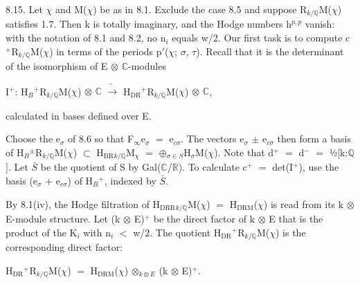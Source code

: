 \documentclass[10pt,twoside]{article}
\begin{document}
8.15. Let \ensuremath{χ} and M(\ensuremath{χ}) be as in 8.1. Exclude the case 8.5 and suppose R\ensuremath{_{k/ℚ}}M(\ensuremath{χ}) satisfies 1.7. Then k is totally imaginary, and the Hodge numbers h\ensuremath{^{p,p}} vanish: with the notation of 8.1 and 8.2, no n\ensuremath{_{i}} equals w/2. Our first task is to compute c\ensuremath{^{+}}R\ensuremath{_{k/ℚ}}M(\ensuremath{χ}) in terms of the periods p\ensuremath{′}(\ensuremath{χ}; \ensuremath{σ}, \ensuremath{τ}). Recall that it is the determinant of the isomorphism of E \ensuremath{⊗} \ensuremath{ℂ}-modules\par
I\ensuremath{^{+}}: H\ensuremath{_{B}}\ensuremath{^{+}}R\ensuremath{_{k/ℚ}}M(\ensuremath{χ}) \ensuremath{⊗} \ensuremath{ℂ}  \ensuremath{\widetilde{→}}  H\ensuremath{_{\mathrm{DR}}}\ensuremath{^{+}}R\ensuremath{_{k/ℚ}}M(\ensuremath{χ}) \ensuremath{⊗} \ensuremath{ℂ},\par
calculated in bases defined over E.\par
Choose the e\ensuremath{_{σ}} of 8.6 so that F\ensuremath{_{∞}}e\ensuremath{_{σ}} \ensuremath{=} e\ensuremath{_{cσ}}. The vectors e\ensuremath{_{σ}} \ensuremath{±} e\ensuremath{_{cσ}} then form a basis of H\ensuremath{_{B}}\ensuremath{^{±}}R\ensuremath{_{k/ℚ}}M(\ensuremath{χ}) \ensuremath{⊂} H\ensuremath{_{\mathrm{BR}}}\ensuremath{_{k/ℚ}}M\ensuremath{_{χ}} \ensuremath{=} \ensuremath{⊕}\ensuremath{_{σ∈S}}H\ensuremath{_{σ}}M(\ensuremath{χ}). Note that d\ensuremath{^{+}} \ensuremath{=} d\ensuremath{^{-}} \ensuremath{=} ½[k:\ensuremath{ℚ}]. Let \ensuremath{\bar{S}} be the quotient of S by Gal(\ensuremath{ℂ}/\ensuremath{ℝ}). To calculate c\ensuremath{^{+}} \ensuremath{=} det(I\ensuremath{^{+}}), use the basis (e\ensuremath{_{σ}} \ensuremath{+} e\ensuremath{_{cσ}}) of H\ensuremath{_{B}}\ensuremath{^{+}}, indexed by \ensuremath{\bar{S}}.\par
By 8.1(iv), the Hodge filtration of H\ensuremath{_{\mathrm{DRR}}}\ensuremath{_{k/ℚ}}M(\ensuremath{χ}) \ensuremath{=} H\ensuremath{_{\mathrm{DRM}}}(\ensuremath{χ}) is read from its k \ensuremath{⊗} E-module structure. Let (k \ensuremath{⊗} E)\ensuremath{^{+}} be the direct factor of k \ensuremath{⊗} E that is the product of the K\ensuremath{_{i}} with n\ensuremath{_{i}} \ensuremath{<} w/2. The quotient H\ensuremath{_{\mathrm{DR}}}\ensuremath{^{+}}R\ensuremath{_{k/ℚ}}M(\ensuremath{χ}) is the corresponding direct factor:\par
H\ensuremath{_{\mathrm{DR}}}\ensuremath{^{+}}R\ensuremath{_{k/ℚ}}M(\ensuremath{χ}) \ensuremath{=} H\ensuremath{_{\mathrm{DRM}}}(\ensuremath{χ}) \ensuremath{⊗}\ensuremath{_{k⊗E}} (k \ensuremath{⊗} E)\ensuremath{^{+}}.\par
\end{document}
